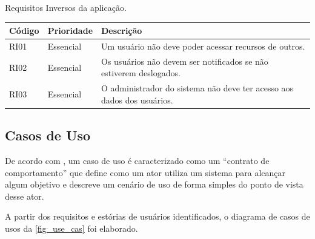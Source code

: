 \begin{quadro}[htb]
    \begin{center}
        \ABNTEXfontereduzida
        \caption{Requisitos Inversos da aplicação.}
        \label{qua-req-inv}
        \begin{tabular}{|p{1.1cm}|p{1.5cm}|p{10.5cm}|}
            \hline
            \textbf{Código} & \textbf{Prioridade} & \textbf{Descrição}         \\
            \hline
            RI01            & Essencial           &
            Um usuário não deve poder acessar recursos de outros.              \\
            \hline
            RI02            & Essencial           &
            Os usuários não devem ser notificados se não estiverem deslogados. \\
            \hline
            RI03            & Essencial           &
            O administrador do sistema não deve ter acesso aos dados dos usuários. \\
            \hline
        \end{tabular}
    \end{center}
\end{quadro}

\newpage

\subsection{Casos de Uso}

De acordo com , um caso de uso é caracterizado como um ``contrato de comportamento'' que define como
um ator utiliza um sistema para alcançar algum objetivo e descreve um cenário de uso de forma simples do ponto de vista desse ator.

A partir dos requisitos e estórias de usuários identificados, o diagrama de casos de usos da \autoref{fig_use_cas} foi elaborado.


